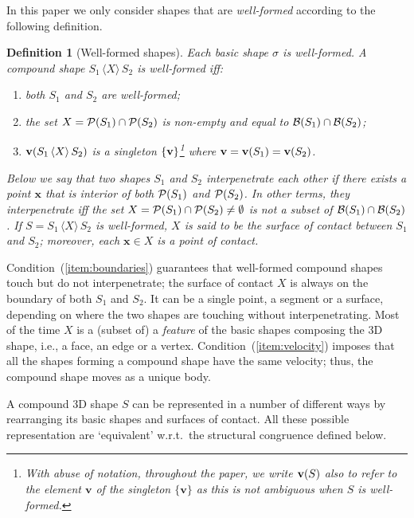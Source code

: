 \documentclass[11pt]{article}
\newcommand{\union}[1]{\ensuremath{\,\langle #1 \rangle\,}}
\newcommand{\boundary}[1]{\ensuremath{{\cal B}(#1)}}
\newcommand{\points}[1]{\ensuremath{{\cal P}(#1)}}
\newcommand{\velocity}[1]{{\bf v}(#1)}
\newtheorem{definition}{Definition}
\begin{document}
In this paper we only consider shapes that are \emph{well-formed} according to the following
definition.

\begin{definition}[Well-formed shapes]
\label{def:shapeswf}
Each basic shape $\sigma$ is well-formed. A compound shape $S_1 \union{X} S_2$ is well-formed
iff:
\begin{enumerate}
\item both $S_1$ and $S_2$ are well-formed;
\item \label{item:boundaries} the set $X = \points{S_1} \cap \points{S_2}$ is {\em non-empty} and
equal to $\boundary{S_1} \cap \boundary{S_2}$;
\item \label{item:velocity} $\velocity{S_1 \union{X} S_2}$ is a singleton $\{{\bf v}\}$\footnote{With abuse of notation, throughout the paper, we write $\velocity{S}$ also to refer to the element $\mathbf{v}$ of the singleton  $\{ \mathbf{v} \}$ as this is not ambiguous when $S$ is
well-formed.} where ${\bf v} = \velocity{S_1} = \velocity{S_2}$.
\end{enumerate}

\noindent Below we say that two shapes $S_1$ and $S_2$ {\em interpenetrate} each other if there exists a point $\mathbf{x}$ that is interior of both $\points{S_1}$ and $\points{S_2}$. In other terms, they interpenetrate iff the set $X= \points{S_1} \cap \points{S_2} \neq \emptyset$ is not a subset of $ \boundary{S_1} \cap \boundary{S_2}$. If $S = S_1 \union{X} S_2$ is well-formed, $X$ is said to be the {\em surface of contact} between $S_1$ and $S_2$; moreover, each  $\mathbf{x} \in X$ is a {\em point of contact}.
\end{definition}

Condition~(\ref{item:boundaries}) guarantees that well-formed compound shapes touch but do not
interpenetrate; the surface of contact $X$ is always on the boundary of both $S_1$ and $S_2$. It
can be a single point, a segment or a surface, depending on where the two shapes are touching
without interpenetrating. Most of the time $X$ is a (subset of) a \emph{feature} of the
basic shapes composing the 3D shape, i.e., a face, an edge or a vertex.
Condition~(\ref{item:velocity}) imposes that all the shapes forming a compound shape have the same
velocity; thus, the compound shape moves as a unique body.

A compound 3D shape $S$ can be represented in a number of different ways by rearranging its basic
shapes and surfaces of contact. All these possible representation are `equivalent' w.r.t.\  the
structural congruence defined below.
\end{document}

